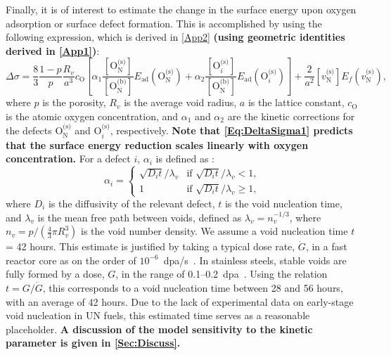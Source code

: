 \documentclass[preprint,12pt,sort&compress]{elsarticle}
\newcommand{\?}{\stackrel{?}{=}}
\providecommand{\DIFaddtex}[1]{{\bf #1}} %
\providecommand{\DIFdeltex}[1]{} %
\providecommand{\DIFaddbegin}{\protect\color{blue}} %
\providecommand{\DIFaddend}{\protect\color{black}} %
\providecommand{\DIFdelbegin}{\protect\color{red}} %
\providecommand{\DIFdelend}{\protect\color{black}} %
\providecommand{\DIFadd}[1]{\texorpdfstring{\DIFaddtex{#1}}{#1}} %
\providecommand{\DIFdel}[1]{\texorpdfstring{\DIFdeltex{#1}}{}} %
\newcommand{\DIFscaledelfig}{0.5}
\newlength{\DIFdelgraphicswidth} %
\newlength{\DIFdelgraphicsheight} %
\newcommand{\DIFaddincludegraphics}[2][]{{\color{blue}\fbox{\DIFOincludegraphics[#1]{#2}}}} %
\newcommand{\DIFdelincludegraphics}[2][]{%
\sbox{\DIFdelgraphicsbox}{\DIFOincludegraphics[#1]{#2}}%
\settoboxwidth{\DIFdelgraphicswidth}{\DIFdelgraphicsbox} %
\settoboxtotalheight{\DIFdelgraphicsheight}{\DIFdelgraphicsbox} %
\scalebox{\DIFscaledelfig}{%
\parbox[b]{\DIFdelgraphicswidth}{\usebox{\DIFdelgraphicsbox}\\[-\baselineskip] \rule{\DIFdelgraphicswidth}{0em}}\llap{\resizebox{\DIFdelgraphicswidth}{\DIFdelgraphicsheight}{%
\setlength{\unitlength}{\DIFdelgraphicswidth}%
\begin{picture}(1,1)%
\thicklines\linethickness{2pt} %
{\color[rgb]{1,0,0}\put(0,0){\framebox(1,1){}}}%
{\color[rgb]{1,0,0}\put(0,0){\line( 1,1){1}}}%
{\color[rgb]{1,0,0}\put(0,1){\line(1,-1){1}}}%
\end{picture}%
}\hspace*{3pt}}} %
} %
\DeclareRobustCommand{\DIFaddbegin}{\DIFOaddbegin \let\includegraphics\DIFaddincludegraphics} %
\DeclareRobustCommand{\DIFaddend}{\DIFOaddend \let\includegraphics\DIFOincludegraphics} %
\DeclareRobustCommand{\DIFdelbegin}{\DIFOdelbegin \let\includegraphics\DIFdelincludegraphics} %
\DeclareRobustCommand{\DIFdelend}{\DIFOaddend \let\includegraphics\DIFOincludegraphics} %
\begin{document}
Finally, it is of interest to estimate the change in the surface energy upon oxygen adsorption or surface defect formation. This is accomplished by using the following expression, which is derived in \ref{App2} \DIFaddbegin \DIFadd{(using geometric identities derived in \ref{App1})}\DIFaddend :
\begin{equation}
\Delta \sigma = \frac{8}{3} \frac{1-p}{p} \frac{R_v}{a^3} c_\text{O} \left[ \alpha_1 \frac{ [ \text{O}_\text{N}^{\text{(s)}} ] }{ [ \text{O}_\text{N}^{\text{(b)}} ] }  E_\text{ad}( \text{O}_\text{N}^{\text{(s)}} ) + \alpha_2 \frac{ [ \text{O}_i^{\text{(s)}} ] }{ [ \text{O}_\text{N}^{\text{(b)}} ] }  E_\text{ad}( \text{O}_i^{\text{(s)}} ) \right] + \frac{2}{a^2} [ v_\text{N}^{\text{(s)}} ] E_f ( v_\text{N}^{\text{(s)}} ),
\label{Eq:DeltaSigma1}
\end{equation}
where $p$ is the porosity, $R_v$ is the average void radius, $a$ is the lattice constant, $c_\text{O}$ is the atomic oxygen concentration, and $\alpha_1$ and $\alpha_2$ are the kinetic corrections for the defects $\text{O}_\text{N}^\text{(s)}$ and $\text{O}_i^{\text{(s)}}$, respectively. \DIFaddbegin \DIFadd{Note that \cref{Eq:DeltaSigma1} predicts that the surface energy reduction scales linearly with oxygen concentration. }\DIFaddend For a defect $i$, $\alpha_i$ is defined as \cite{Zinkle1990}:
\begin{equation}
\alpha_i =
\begin{cases}
    \sqrt{D_i t}/\lambda_v & \text{if } \sqrt{D_i t}/\lambda_v < 1, \\
    1 & \text{if } \sqrt{D_i t}/\lambda_v \geq 1,
\end{cases}
\label{Eq:alpha}
\end{equation}
where $D_i$ is the diffusivity of the relevant defect, $t$ is the void nucleation time, and $\lambda_v$ is the mean free path between voids, defined as $\lambda_v = n_v^{-1/3}$, where $n_v = p / ( \frac{4}{3} \pi R_v^3 )$ is the void number density. We assume a void nucleation time $t$ = 42 hours. This estimate is justified by taking a typical dose rate, $\dot{G}$, in a fast reactor core as on the order of $10^{-6}$~dpa/s~\cite{Mansur1983, Saha2018}. In stainless steels, stable voids are fully formed by a dose, $G$, in the range of 0.1--0.2~dpa~\cite{Surh2004}. Using the relation $t = G / \dot{G}$, this corresponds to a void nucleation time between 28 and 56 hours, with an average of 42 hours. Due to the lack of experimental data on early-stage void nucleation in UN fuels, this estimated time serves as a reasonable placeholder\DIFdelbegin \DIFdel{, but with unknown uncertainty. Note that \cref{Eq:DeltaSigma1} predicts that the surface energy reduction scales linearly with oxygen concentration}\DIFdelend . \DIFaddbegin \DIFadd{A discussion of the model sensitivity to the kinetic parameter is given in \cref{Sec:Discuss}.
}\DIFaddend 
\end{document}
